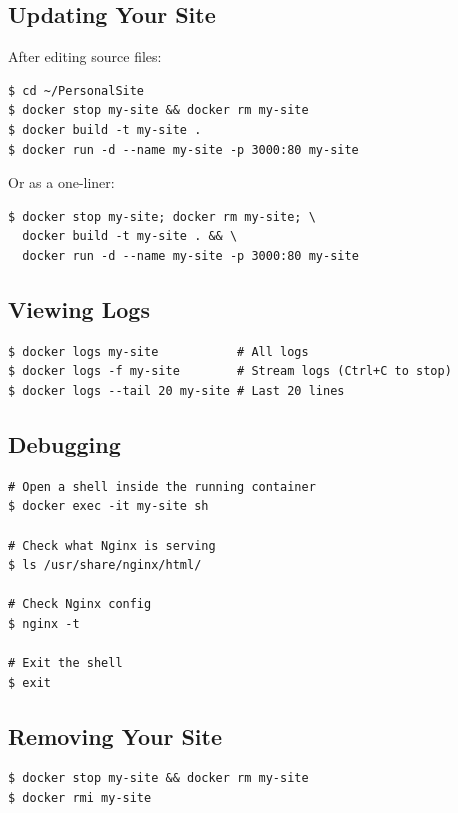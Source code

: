 \documentclass[11pt, letterpaper]{article}
\begin{document}
\subsection{Updating Your Site}

After editing source files:

\begin{lstlisting}[style=terminal]
$ cd ~/PersonalSite
$ docker stop my-site && docker rm my-site
$ docker build -t my-site .
$ docker run -d --name my-site -p 3000:80 my-site
\end{lstlisting}

Or as a one-liner:

\begin{lstlisting}[style=terminal]
$ docker stop my-site; docker rm my-site; \
  docker build -t my-site . && \
  docker run -d --name my-site -p 3000:80 my-site
\end{lstlisting}

\subsection{Viewing Logs}

\begin{lstlisting}[style=terminal]
$ docker logs my-site           # All logs
$ docker logs -f my-site        # Stream logs (Ctrl+C to stop)
$ docker logs --tail 20 my-site # Last 20 lines
\end{lstlisting}

\subsection{Debugging}

\begin{lstlisting}[style=terminal]
# Open a shell inside the running container
$ docker exec -it my-site sh

# Check what Nginx is serving
$ ls /usr/share/nginx/html/

# Check Nginx config
$ nginx -t

# Exit the shell
$ exit
\end{lstlisting}

\subsection{Removing Your Site}

\begin{lstlisting}[style=terminal]
$ docker stop my-site && docker rm my-site
$ docker rmi my-site
\end{lstlisting}
\end{document}

